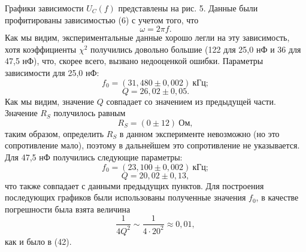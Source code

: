 \documentclass[12pt,a4paper]{article}
\begin{document}
Графики зависимости $U_C(f)$ представлены на рис. 5. Данные были профитированы зависимостью (6) с учетом того, что
\begin{equation}
\omega = 2\pi f.
\end{equation}
Как мы видим, экспериментальные данные хорошо легли на эту зависимость, хотя коэффициенты $\chi^2$ получились довольно большие (122 для 25,0 нФ и 36 для 47,5 нФ), что, скорее всего, вызвано недооценкой ошибки. Параметры зависимости для 25,0 нФ:
\begin{equation}
f_0 = (31,480\pm0,002)~\text{кГц};
\end{equation}
\begin{equation}
Q = 26,02\pm0,05.
\end{equation}
Как мы видим, значение $Q$ совпадает со значением из предыдущей части. Значение $R_S$ получилось равным
\begin{equation}
R_S = (0\pm12)~\text{Ом},
\end{equation} 
таким образом, определить $R_S$ в данном эксперименте невозможно (но это сопротивление мало), поэтому в дальнейшем это сопротивление не указывается. Для 47,5 нФ получились следующие параметры:
\begin{equation}
f_0 = (23,100\pm0,002)~\text{кГц};
\end{equation}
\begin{equation}
Q = 20,02\pm0,13,
\end{equation}
что также совпадает с данными предыдущих пунктов. Для построения последующих графиков были использованы полученные значения $f_0$, в качестве погрешности была взята величина
\begin{equation}
\frac{1}{4Q^2}\sim\frac{1}{4\cdot20^2}\approx0,01,
\end{equation}
как и было в (42).
\end{document}
